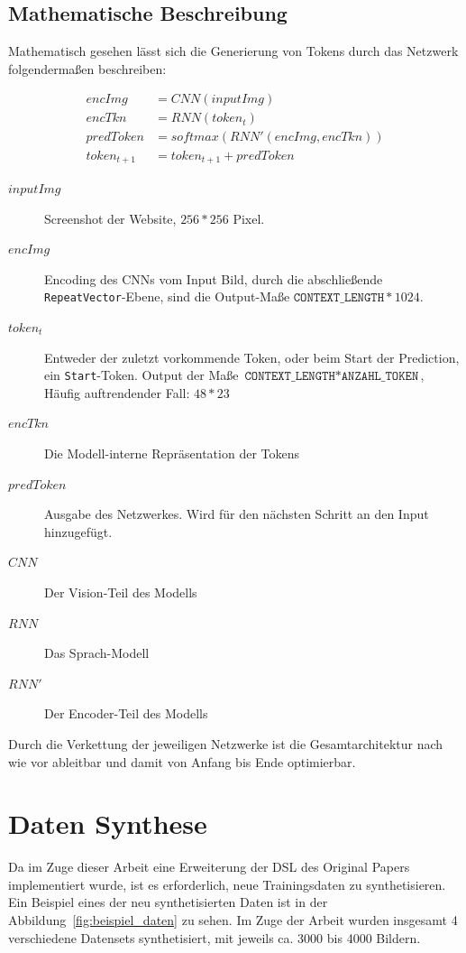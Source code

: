 \documentclass[pdftex,a4paper,halfparskip, article]{scrartcl}
\begin{document}
\subsection{Mathematische Beschreibung}

Mathematisch gesehen lässt sich die Generierung von Tokens durch das Netzwerk folgendermaßen beschreiben:

\begin{equation}
\begin{aligned}
encImg  &= CNN(inputImg) \\
encTkn &= RNN(token_t) \\
predToken &= softmax(RNN'(encImg, encTkn)) \\
token_{t+1} &= token_{t+1} + predToken
\end{aligned}
\end{equation}


\begin{description}
	\item[$inputImg$] Screenshot der Website, $256 * 256$ Pixel.
	\item[$encImg$] Encoding des CNNs vom Input Bild, durch die abschließende \texttt{RepeatVector}-Ebene, sind die Output-Maße $\texttt{CONTEXT\_LENGTH} * 1024$. 
	\item[$token_t$] Entweder der zuletzt vorkommende Token, oder beim Start der Prediction, ein \texttt{Start}-Token. Output der Maße $\texttt{CONTEXT\_LENGTH} * \texttt{ANZAHL\_TOKEN}$, Häufig auftrendender Fall: $48 * 23$ 
	\item[$encTkn$] Die Modell-interne Repräsentation der Tokens
	\item[$predToken$] Ausgabe des Netzwerkes. Wird für den nächsten Schritt an den Input hinzugefügt.
	\\
	\item[$CNN$] Der Vision-Teil des Modells
	\item[$RNN$] Das Sprach-Modell
	\item[$RNN'$] Der Encoder-Teil des Modells
\end{description}

Durch die Verkettung der jeweiligen Netzwerke ist die Gesamtarchitektur nach wie vor ableitbar und damit von Anfang bis Ende optimierbar. 

\section{Daten Synthese}

Da im Zuge dieser Arbeit eine Erweiterung der DSL des Original Papers implementiert wurde, ist es erforderlich, neue Trainingsdaten zu synthetisieren. Ein Beispiel eines der neu synthetisierten Daten ist in der Abbildung~\ref{fig:beispiel_daten} zu sehen. Im Zuge der Arbeit wurden insgesamt 4 verschiedene Datensets synthetisiert, mit jeweils ca. 3000 bis 4000 Bildern. 
\end{document}
